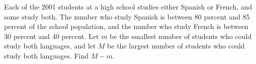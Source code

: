 Each of the 2001 students at a high school studies either Spanish or French, and some study both. The number who study Spanish is between 80 percent and 85 percent of the school population, and the number who study French is between 30 percent and 40 percent. Let $m$ be the smallest number of students who could study both languages, and let $M$ be the largest number of students who could study both languages. Find $M-m$.